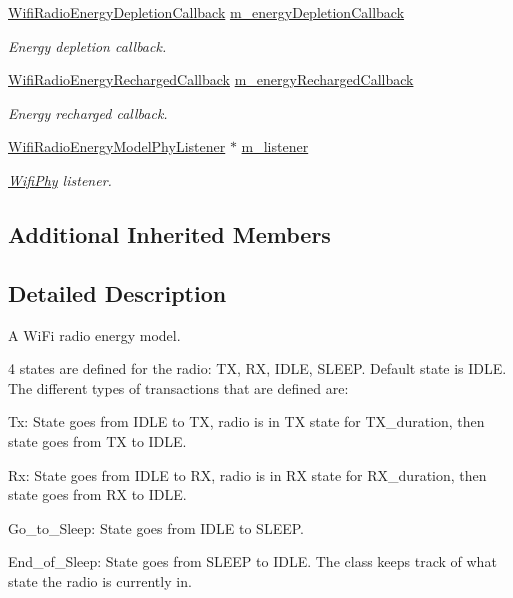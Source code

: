 \begin{DoxyCompactItemize}
\hyperlink{classns3_1_1WifiRadioEnergyModel_afdab2f5c9b565fd1ef7cf3fddd62ffab}{Wifi\+Radio\+Energy\+Depletion\+Callback} \hyperlink{classns3_1_1WifiRadioEnergyModel_a0ab3934b2689e98271139392afae9257}{m\+\_\+energy\+Depletion\+Callback}
\begin{DoxyCompactList}\small\item\em Energy depletion callback. \end{DoxyCompactList}\item 
\hyperlink{classns3_1_1WifiRadioEnergyModel_a1b594cba69350dd9bb93fc525f6124c4}{Wifi\+Radio\+Energy\+Recharged\+Callback} \hyperlink{classns3_1_1WifiRadioEnergyModel_a420321432e0dc4b87eec0add426068e6}{m\+\_\+energy\+Recharged\+Callback}
\begin{DoxyCompactList}\small\item\em Energy recharged callback. \end{DoxyCompactList}\item 
\hyperlink{classns3_1_1WifiRadioEnergyModelPhyListener}{Wifi\+Radio\+Energy\+Model\+Phy\+Listener} $\ast$ \hyperlink{classns3_1_1WifiRadioEnergyModel_a439140a51be500a6605edd1893b3495e}{m\+\_\+listener}
\begin{DoxyCompactList}\small\item\em \hyperlink{classns3_1_1WifiPhy}{Wifi\+Phy} listener. \end{DoxyCompactList}\end{DoxyCompactItemize}
\subsection*{Additional Inherited Members}


\subsection{Detailed Description}
A Wi\+Fi radio energy model. 

4 states are defined for the radio\+: TX, RX, I\+D\+LE, S\+L\+E\+EP. Default state is I\+D\+LE. The different types of transactions that are defined are\+:
\begin{DoxyEnumerate}
\item Tx\+: State goes from I\+D\+LE to TX, radio is in TX state for T\+X\+\_\+duration, then state goes from TX to I\+D\+LE.
\item Rx\+: State goes from I\+D\+LE to RX, radio is in RX state for R\+X\+\_\+duration, then state goes from RX to I\+D\+LE.
\item Go\+\_\+to\+\_\+\+Sleep\+: State goes from I\+D\+LE to S\+L\+E\+EP.
\item End\+\_\+of\+\_\+\+Sleep\+: State goes from S\+L\+E\+EP to I\+D\+LE. The class keeps track of what state the radio is currently in.
\end{DoxyEnumerate}

